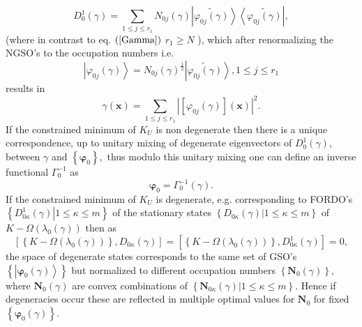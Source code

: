 \documentclass[aps,preprint]{revtex4}%
\begin{document}
\begin{equation}
D_{0}^{1}\left(  \gamma\right)  =\sum_{1\leq j\leq r_{1}}N_{0j}\left(
\gamma\right)  \left\vert \widetilde{\varphi_{0j}\left(  \gamma\right)
}\right\rangle \left\langle \widetilde{\varphi_{0j}\left(  \gamma\right)
}\right\vert ,
\end{equation}
(where in contrast to eq. $\left(  \ref{Gamma}\right)  $ $r_{1}\geq N$ ),
which after renormalizing the NGSO's to the occupation numbers i.e.
\begin{equation}
\left\vert \varphi_{0j}\left(  \gamma\right)  \right\rangle =N_{0j}\left(
\gamma\right)  ^{\frac{1}{2}}\left\vert \widetilde{\varphi_{0j}\left(
\gamma\right)  }\right\rangle ,1\leq j\leq r_{1}%
\end{equation}
results in
\begin{equation}
\gamma\left(  \mathbf{x}\right)  =\sum_{1\leq j\leq r_{1}}\left\vert \left[
\varphi_{0j}\left(  \gamma\right)  \right]  \left(  \mathbf{x}\right)
\right\vert ^{2}. \label{gammaKS}%
\end{equation}
If the constrained minimum of $K_{U}$ is non degenerate then there is a unique
correspondence, up to unitary mixing of degenerate eigenvectors of $D_{0}%
^{1}\left(  \gamma\right)  ,$ between $\gamma$ and $\left\{  \mathbf{\varphi
}_{0}\right\}  ,$ thus modulo this unitary mixing one can define an inverse
functional $\Gamma_{0}^{-1}$ as
\begin{equation}
\mathbf{\varphi}_{0}=\Gamma_{0}^{-1}\left(  \gamma\right)  .
\end{equation}
If the constrained minimum of $K_{U}$ is degenerate, e.g. corresponding to
FORDO's $\left\{  \left.  D_{0\kappa}^{1}\left(  \gamma\right)  \right\vert
1\leq\kappa\leq m\right\}  $ of the stationary states $\left\{  \left.
D_{0\kappa}\left(  \gamma\right)  \right\vert 1\leq\kappa\leq m\right\}  $ of
$K-\Omega\left(  \lambda_{0}\left(  \gamma\right)  \right)  $ then as
\begin{equation}
\left[  \left\{  K-\Omega\left(  \lambda_{0}\left(  \gamma\right)  \right)
\right\}  ,D_{0\kappa}\left(  \gamma\right)  \right]  =\left[  \left\{
K-\Omega\left(  \lambda_{0}\left(  \gamma\right)  \right)  \right\}
,D_{0\kappa}^{1}\left(  \gamma\right)  \right]  =0,
\end{equation}
the space of degenerate states corresponds to the same set of GSO's $\left\{
\left\vert \mathbf{\varphi}_{0}\left(  \gamma\right)  \right\rangle \right\}
$ but normalized to different occupation numbers $\left\{  \mathbf{N}%
_{0}\left(  \gamma\right)  \right\}  ,$ where $\mathbf{N}_{0}\left(
\gamma\right)  $ are convex combinations of $\left\{  \left.  \mathbf{N}%
_{0\kappa}\left(  \gamma\right)  \right\vert 1\leq\kappa\leq m\right\}  $.
Hence if degeneracies occur these are reflected in multiple optimal values for
$\mathbf{\mathbf{N}}_{0}$ for fixed $\left\{  \mathbf{\varphi}_{0}\left(
\gamma\right)  \right\}  \mathbf{.}$
\end{document}
